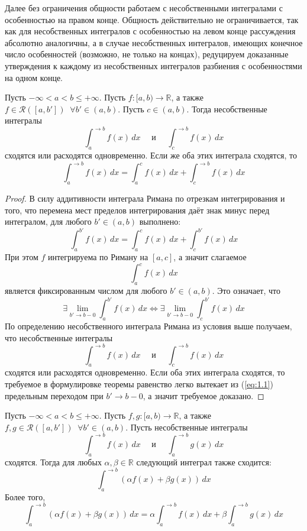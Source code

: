 \documentclass[11pt]{article}
\begin{document}
\begin{remark}
    Далее без ограничения общности работаем с несобственными интегралами с особенностью на правом конце. Общность действительно не ограничивается, так как для несобственных интегралов с особенностью на левом конце рассуждения абсолютно аналогичны, а в случае несобственных интегралов, имеющих конечное число особенностей (возможно, не только на концах), редуцируем доказанные утверждения к каждому из несобственных интегралов разбиения с особенностями на одном конце.
\end{remark}

\begin{theorem}
    Пусть $- \infty < a < b \leq + \infty$. Пусть $f \colon [a, b) \to \mathbb{R}$, а также $f \in \mathcal{R}([a, b']) \; \; \forall b' \in (a, b)$. Пусть $c \in (a, b)$. Тогда несобственные интегралы 
    \[\int_{a}^{\to b} f(x) \, dx \quad \text{ и } \quad \int_{c}^{\to b} f(x) \, dx \]
    сходятся или расходятся одновременно. Если же оба этих интеграла сходятся, то
    \[\int_{a}^{\to b} f(x) \, dx = \int_{a}^{c} f(x) \, dx + \int_{c}^{\to b} f(x) \, dx\]
\end{theorem}

\begin{proof}
    В силу аддитивности интеграла Римана по отрезкам интегрирования и того, что перемена мест пределов интегрирования даёт знак минус перед интегралом, для любого $b' \in (a, b)$ выполнено:
    \begin{equation*} \label{eq:1.1} \tag{$\ast$}
        \int_{a}^{b'} f(x) \, dx = \int_{a}^{c} f(x) \, dx + \int_{c}^{b'} f(x) \, dx
    \end{equation*}
    При этом $f$ интегрируема по Риману на $[a, c]$, а значит слагаемое 
    \[\int_{a}^{c} f(x) \, dx\]
    является фиксированным числом для любого $b' \in (a, b)$. Это означает, что 
    \[\exists \lim_{b' \to b - 0} \int_{a}^{b'} f(x) \, dx \iff \exists \lim_{b' \to b - 0} \int_{c}^{b'} f(x) \, dx\]
    По определению несобственного интеграла Римана из условия выше получаем, что несобственные интегралы 
    \[\int_{a}^{\to b} f(x) \, dx \quad \text{ и } \quad \int_{c}^{\to b} f(x) \, dx \]
    сходятся или расходятся одновременно. Если оба этих интеграла сходятся, то требуемое в формулировке теоремы равенство легко вытекает из (\ref{eq:1.1}) предельным переходом при $b' \to b - 0$, а значит требуемое доказано.
\end{proof}

\begin{theorem}
    Пусть $- \infty < a < b \leq + \infty$. Пусть $f, g \colon [a, b) \to \mathbb{R}$, а также $f, g \in \mathcal{R}([a, b']) \; \; \forall b' \in (a, b)$. Пусть несобственные интегралы 
    \[\int_{a}^{\to b} f(x) \, dx \quad \text{ и } \quad \int_{a}^{\to b} g(x) \, dx\]
    сходятся. Тогда для любых $\alpha, \beta \in \mathbb{R}$ следующий интеграл также сходится:
    \[\int_{a}^{\to b} (\alpha f(x) + \beta g(x)) \, dx\]
    Более того,
    \[\int_{a}^{\to b} (\alpha f(x) + \beta g(x)) \, dx = \alpha \int_{a}^{\to b} f(x) \, dx + \beta \int_{a}^{\to b} g(x) \, dx\]
\end{theorem}
\end{document}
